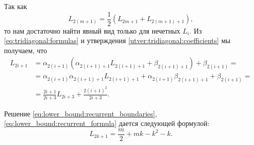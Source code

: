 Так как 
\[
L_{2(m + 1)} = \frac{1}{2} (L_{2m+1} + L_{2(m+1) + 1}),
\]
то нам достаточно найти явный вид только для нечетных $ L_i $. Из \eqref{eq:tridiagonal:formulas} и утверждения \ref{utver:tridiagonal:coefficients} мы получаем, что
\begin{align}
\label{eq:lower_bound:recurrent_formula}
L_{2i+1} &= \alpha_{2(i+1)}(
    \alpha_{2(i+1)+1} L_{2(i+1)+1} + \beta_{2(i+1)+1}
    ) + \beta_{2(i+1)} = \nonumber \\
&= \alpha_{2(i+1)}\alpha_{2(i+1)+1} L_{2(i+1)+1} +
    \alpha_{2(i+1)}\beta_{2(i+1)+1} + \beta_{2(i+1)} = \nonumber \\
&= \frac{2i+1}{2i+3} L_{2i+3} + \frac{2(i+1)^2}{2i+3}.
\end{align}

\begin{utver}
\label{utver:lower_bound:solution}
Решение \eqref{eq:lower_bound:recurrent_boundaries}, \eqref{eq:lower_bound:recurrent_formula} дается следующей формулой:
\begin{equation}
\label{eq:lower_bound:recurrence_solution}
L_{2k+1} = \frac{m}{2} + mk - k^2 - k.
\end{equation}
\end{utver}
